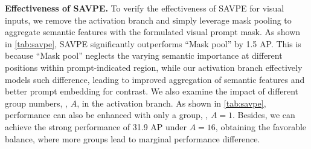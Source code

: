 \documentclass[10pt,twocolumn,letterpaper]{article}
\begin{document}
\begin{figure}[t]
\begin{minipage}{.216\textwidth}
    \label{tab:savpe}
    \centering
    \small
    \setlength{\tabcolsep}{2.5pt}
\end{minipage}
\hfill
\begin{minipage}{.257\textwidth}
    \label{tab:lrpc}
    \centering
    \small
    \setlength{\tabcolsep}{2.45pt}
\end{minipage}
\vspace{-15pt}
\end{figure}

\textbf{Effectiveness of SAVPE.} To verify the effectiveness of SAVPE for visual inputs, we remove the activation branch and simply leverage mask pooling to aggregate semantic features with the formulated visual prompt mask. As shown in \cref{tab:savpe}, SAVPE significantly outperforms ``Mask pool'' by 1.5 AP. This is because ``Mask pool'' neglects the varying semantic importance at different positions within prompt-indicated region, while our activation branch effectively models such difference, leading to improved aggregation of semantic features and better prompt embedding for contrast. We also examine the impact of different group numbers, \ie, $A$, in the activation branch. As shown in \cref{tab:savpe}, performance can also be enhanced with only a group, \ie, $A=1$. Besides, we can achieve the strong performance of 31.9 AP under $A=16$, obtaining the favorable balance, where more groups lead to marginal performance difference.
\end{document}
